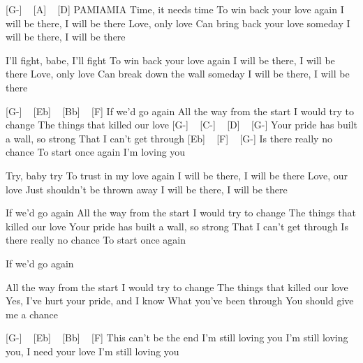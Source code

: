 [G-] ~ [A] ~ [D]
PAMIAMIA
Time, it needs time
To win back your love again
I will be there, I will be there
Love, only love
Can bring back your love someday
I will be there, I will be there

I'll fight, babe, I'll fight
To win back your love again
I will be there, I will be there
Love, only love
Can break down the wall someday
I will be there, I will be there

[G-] ~ [Eb] ~ [Bb] ~ [F]
If we'd go again
All the way from the start
I would try to change
The things that killed our love
[G-] ~ [C-] ~ [D] ~ [G-]
Your pride has built a wall, so strong
That I can't get through
[Eb] ~ [F] ~ [G-]
Is there really no chance
To start once again
I'm loving you


Try, baby try
To trust in my love again
I will be there, I will be there
Love, our love
Just shouldn't be thrown away
I will be there, I will be there

If we'd go again
All the way from the start
I would try to change
The things that killed our love
Your pride has built a wall, so strong
That I can't get through
Is there really no chance
To start once again

If we'd go again

All the way from the start
I would try to change
The things that killed our love
Yes, I've hurt your pride, and I know
What you've been through
You should give me a chance

[G-] ~ [Eb] ~ [Bb] ~ [F]
This can't be the end
I'm still loving you
I'm still loving you, I need your love
I'm still loving you 